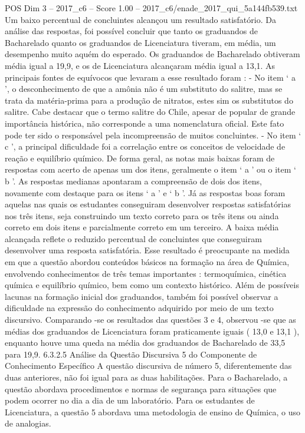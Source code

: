 \begin{textsample}{POS Dim 3 – 2017\_c6 – Score 1.00 – 2017\_c6/enade\_2017\_qui\_5a144fb539.txt}
Um baixo percentual de concluintes alcançou um resultado satisfatório.
Da análise das respostas, foi possível concluir que tanto os graduandos de Bacharelado quanto os graduandos de Licenciatura tiveram, em média, um desempenho muito aquém do esperado.
Os graduandos de Bacharelado obtiveram média igual a 19,9, e os de Licenciatura alcançaram média igual a 13,1.
As principais fontes de equívocos que levaram a esse resultado foram : - No item ‘ a ’, o desconhecimento de que a amônia não é um substituto do salitre, mas se trata da matéria-prima para a produção de nitratos, estes sim os substitutos do salitre.
Cabe destacar que o termo salitre do Chile, apesar de popular de grande importância histórica, não corresponde a uma nomenclatura oficial.
Este fato pode ter sido o responsável pela incompreensão de muitos concluintes. - No item ‘ c ’, a principal dificuldade foi a correlação entre os conceitos de velocidade de reação e equilíbrio químico.
De forma geral, as notas mais baixas foram de respostas com acerto de apenas um dos itens, geralmente o item ‘ a ’ ou o item ‘ b ’.
As respostas medianas apontaram a compreensão de dois dos itens, novamente com destaque para os itens ‘ a ’ e ‘ b ’.
Já as respostas boas foram aquelas nas quais os estudantes conseguiram desenvolver respostas satisfatórias nos três itens, seja construindo um texto correto para os três itens ou ainda correto em dois itens e parcialmente correto em um terceiro.
A baixa média alcançada reflete o reduzido percentual de concluintes que conseguiram desenvolver uma resposta satisfatória.
Esse resultado é preocupante na medida em que a questão abordou conteúdos básicos na formação na área de Química, envolvendo conhecimentos de três temas importantes : termoquímica, cinética química e equilíbrio químico, bem como um contexto histórico.
Além de possíveis lacunas na formação inicial dos graduandos, também foi possível observar a dificuldade na expressão do conhecimento adquirido por meio de um texto discursivo.
Comparando -se os resultados das questões 3 e 4, observou -se que as médias dos graduandos de Licenciatura foram praticamente iguais ( 13,0 e 13,1 ), enquanto houve uma queda na média dos graduandos de Bacharelado de 33,5 para 19,9. 6.3.2.5 Análise da Questão Discursiva 5 do Componente de Conhecimento Específico A questão discursiva de número 5, diferentemente das duas anteriores, não foi igual para as duas habilitações.
Para o Bacharelado, a questão abordava procedimentos e normas de segurança para situações que podem ocorrer no dia a dia de um laboratório.
Para os estudantes de Licenciatura, a questão 5 abordava uma metodologia de ensino de Química, o uso de analogias.

\end{textsample}
